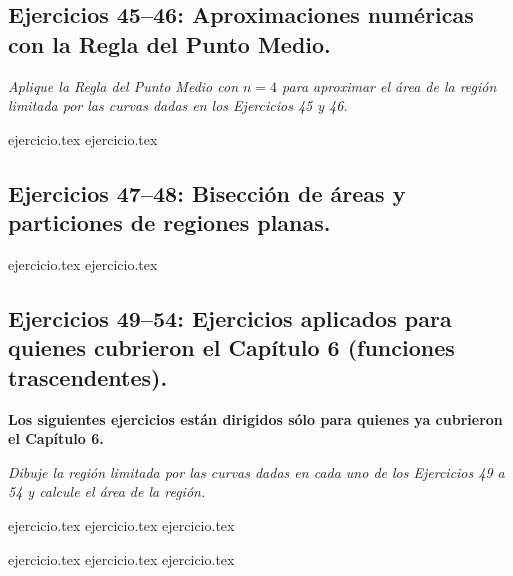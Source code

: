 \subsection*{Ejercicios 45--46: Aproximaciones numéricas con la Regla del Punto Medio.}

\noindent \textit{Aplique la Regla del Punto Medio con $n = 4$ para aproximar el área de la región limitada por las curvas dadas en los Ejercicios 45 y 46.}

\begin{enumerate}
    \setcounter{enumi}{44}
    {ejercicio.tex}
    {ejercicio.tex}
\end{enumerate}

\subsection*{Ejercicios 47--48: Bisección de áreas y particiones de regiones planas.}

\begin{enumerate}
    \setcounter{enumi}{46}
    {ejercicio.tex}
    {ejercicio.tex}
\end{enumerate}

\subsection*{Ejercicios 49--54: Ejercicios aplicados para quienes cubrieron el Capítulo 6 (funciones trascendentes).}

\noindent \textbf{\large Los siguientes ejercicios están dirigidos sólo para quienes ya cubrieron el Capítulo 6.}

\vspace{1em}
\noindent \textit{Dibuje la región limitada por las curvas dadas en cada uno de los Ejercicios 49 a 54 y calcule el área de la región.}

\begin{enumerate}
    \setcounter{enumi}{48}
    \begin{minipage}{0.45\textwidth}
    {ejercicio.tex}
    {ejercicio.tex}
    {ejercicio.tex}
    \end{minipage}%
    \begin{minipage}{0.45\textwidth}
    {ejercicio.tex}
    {ejercicio.tex}
    {ejercicio.tex}
    \end{minipage}
\end{enumerate}
